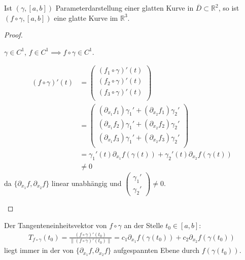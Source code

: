 \documentclass[a4paper,10pt]{scrbook}
\begin{document}
\begin{theorem}[Satz]
  Ist $(\gamma,[a,b])$ Parameterdarstellung einer glatten Kurve in $\overline{D} \subset \mathbb{R}^2$, so ist $(f \circ \gamma,[a,b])$ eine glatte Kurve im $\mathbb{R}^3$.

  \begin{proof}
    \begin{enum-arab}
      \item $\gamma \in C^1$, $f \in C^1 \implies f \circ \gamma \in C^1$.

      \item
      \begin{align*}
        (f \circ \gamma)'(t) &=
        \begin{pmatrix}
          (f_1 \circ \gamma)'(t) \\
          (f_2 \circ \gamma)'(t) \\
          (f_3 \circ \gamma)'(t) \\
        \end{pmatrix} \\
        &=
        \begin{pmatrix}
          (\partial_{x_1} f_1) \gamma_1' + (\partial_{x_2} f_1) \gamma_2' \\
          (\partial_{x_1} f_2) \gamma_1' + (\partial_{x_2} f_2) \gamma_2' \\
          (\partial_{x_1} f_3) \gamma_1' + (\partial_{x_2} f_3) \gamma_2' \\
        \end{pmatrix} \\
        &= \gamma_1'(t) \partial_{x_1} f(\gamma(t)) + \gamma_2'(t) \partial_{x_2} f(\gamma(t)) \\
        &\neq 0
      \end{align*}
      da $\{ \partial_{x_1} f, \partial_{x_2} f \}$ linear unabhängig und $\left(\begin{smallmatrix} \gamma_1' \\ \gamma_2' \end{smallmatrix}\right) \neq 0$.
    \end{enum-arab}
  \end{proof}
\end{theorem}

\begin{notice}[Folgerung:]
  Der Tangenteneinheitsvektor von $f \circ \gamma$ an der Stelle $t_0 \in [a,b]$:
  \begin{align*}
    T_{f \circ \gamma}(t_0) = \frac{(f \circ \gamma)'(t_0)}{\| (f \circ \gamma)'(t_0) \|} = c_1 \partial_{x_1} f(\gamma(t_0)) + c_2 \partial_{x_2} f(\gamma(t_0))
  \end{align*}
  liegt immer in der von $\{ \partial_{x_1} f, \partial_{x_2} f \}$ aufgespannten Ebene durch $f(\gamma(t_0))$.
\end{notice}
\end{document}

